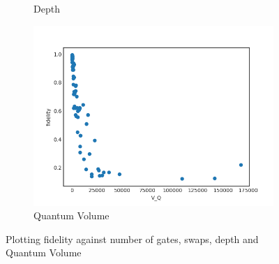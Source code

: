 \documentclass[11pt]{article}
\begin{document}
\begin{figure}[H]
\begin{subfigure}[b]{0.5\linewidth}
    \caption{Depth} 
    \label{fig:f_d_3000} 
  \end{subfigure}%
  \begin{subfigure}[b]{0.5\linewidth}
    \centering
    \includegraphics[width=0.75\linewidth]{f_q_3000} 
    \caption{Quantum Volume} 
    \label{fig:f_q_3000} 
  \end{subfigure} 
  \caption{Plotting fidelity against number of gates, swaps, depth and Quantum Volume}
  \label{fig:f_3000} 
\end{figure}
\end{document}
